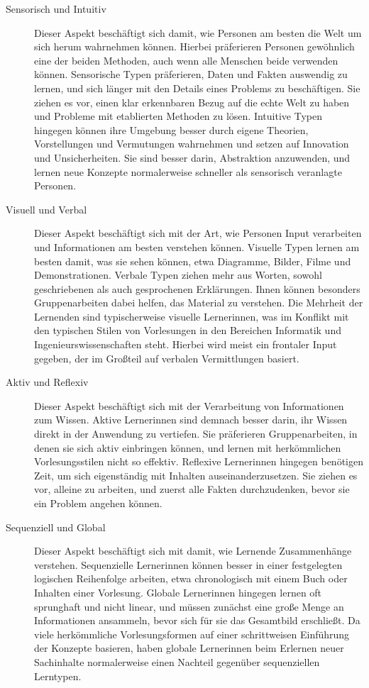 \begin{description}
    \item[Sensorisch und Intuitiv] Dieser Aspekt beschäftigt sich damit, wie Personen am besten die Welt um sich herum wahrnehmen können. Hierbei präferieren Personen gewöhnlich eine der beiden Methoden, auch wenn alle Menschen beide verwenden können. Sensorische Typen präferieren, Daten und Fakten auswendig zu lernen, und sich länger mit den Details eines Problems zu beschäftigen. Sie ziehen es vor, einen klar erkennbaren Bezug auf die echte Welt zu haben und Probleme mit etablierten Methoden zu lösen. Intuitive Typen hingegen können ihre Umgebung besser durch eigene Theorien, Vorstellungen und Vermutungen wahrnehmen und setzen auf Innovation und Unsicherheiten. Sie sind besser darin, Abstraktion anzuwenden, und lernen neue Konzepte normalerweise schneller als sensorisch veranlagte Personen.
    \item[Visuell und Verbal] Dieser Aspekt beschäftigt sich mit der Art, wie Personen Input verarbeiten und Informationen am besten verstehen können. Visuelle Typen lernen am besten damit, was sie sehen können, etwa Diagramme, Bilder, Filme und Demonstrationen. Verbale Typen ziehen mehr aus Worten, sowohl geschriebenen als auch gesprochenen Erklärungen. Ihnen können besonders Gruppenarbeiten dabei helfen, das Material zu verstehen. Die Mehrheit der Lernenden sind typischerweise visuelle Lernerinnen, was im Konflikt mit den typischen Stilen von Vorlesungen in den Bereichen Informatik und Ingenieurswissenschaften steht. Hierbei wird meist ein frontaler Input gegeben, der im Großteil auf verbalen Vermittlungen basiert.
    \item[Aktiv und Reflexiv]  Dieser Aspekt beschäftigt sich mit der Verarbeitung von Informationen zum Wissen. Aktive Lernerinnen sind demnach besser darin, ihr Wissen direkt in der Anwendung zu vertiefen. Sie präferieren Gruppenarbeiten, in denen sie sich aktiv einbringen können, und lernen mit herkömmlichen Vorlesungsstilen nicht so effektiv. Reflexive Lernerinnen hingegen benötigen Zeit, um sich eigenständig mit Inhalten auseinanderzusetzen. Sie ziehen es vor, alleine zu arbeiten, und zuerst alle Fakten durchzudenken, bevor sie ein Problem angehen können.
    \item[Sequenziell und Global] Dieser Aspekt beschäftigt sich mit damit, wie Lernende Zusammenhänge verstehen. Sequenzielle Lernerinnen können besser in einer festgelegten logischen Reihenfolge arbeiten, etwa chronologisch mit einem Buch oder Inhalten einer Vorlesung. Globale Lernerinnen hingegen lernen oft sprunghaft und nicht linear, und müssen zunächst eine große Menge an Informationen ansammeln, bevor sich für sie das Gesamtbild erschließt. Da viele herkömmliche Vorlesungsformen auf einer schrittweisen Einführung der Konzepte basieren, haben globale Lernerinnen beim Erlernen neuer Sachinhalte normalerweise einen Nachteil gegenüber sequenziellen Lerntypen.
\end{description}

